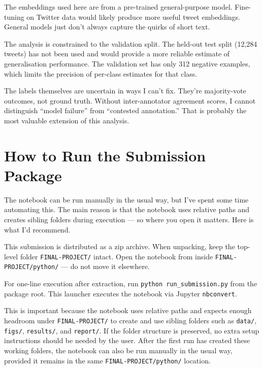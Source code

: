 \documentclass[12pt]{article}
\begin{document}
The embeddings used here are from a pre-trained general-purpose model. Fine-tuning on Twitter data would likely produce more useful tweet embeddings. General models just don't always capture the quirks of short text.

The analysis is constrained to the validation split. The held-out test split (12,284 tweets) has not been used and would provide a more reliable estimate of generalisation performance. The validation set has only 312 negative examples, which limits the precision of per-class estimates for that class.

The labels themselves are uncertain in ways I can't fix. They're majority-vote outcomes, not ground truth. Without inter-annotator agreement scores, I cannot distinguish ``model failure'' from ``contested annotation.'' That is probably the most valuable extension of this analysis.



\nocite{*}





\appendix

\section{How to Run the Submission Package}

The notebook can be run manually in the usual way, but I've spent some time automating this.
The main reason is that the notebook uses relative paths and creates sibling folders during execution --- so where you open it matters.
Here is what I'd recommend.

This submission is distributed as a zip archive.
When unpacking, keep the top-level folder \texttt{FINAL-PROJECT/} intact.
Open the notebook from inside \texttt{FINAL-PROJECT/python/} --- do not move it elsewhere.

For one-line execution after extraction, run \texttt{python run\_submission.py} from the package root.
This launcher executes the notebook via Jupyter \texttt{nbconvert}.

This is important because the notebook uses relative paths and expects enough headroom under \texttt{FINAL-PROJECT/} to create and use sibling folders such as \texttt{data/}, \texttt{figs/}, \texttt{results/}, and \texttt{report/}.
If the folder structure is preserved, no extra setup instructions should be needed by the user.
After the first run has created these working folders, the notebook can also be run manually in the usual way, provided it remains in the same \texttt{FINAL-PROJECT/python/} location.
\end{document}
